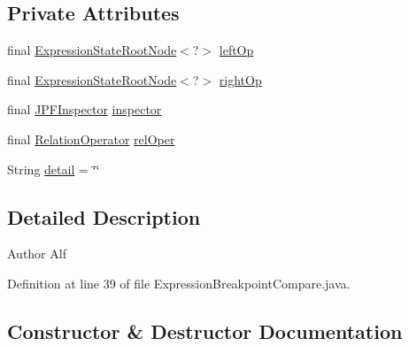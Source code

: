 \subsection*{Private Attributes}
\begin{DoxyCompactItemize}
\item 
final \hyperlink{interfacegov_1_1nasa_1_1jpf_1_1inspector_1_1server_1_1expression_1_1_expression_state_root_node}{Expression\+State\+Root\+Node}$<$?$>$ \hyperlink{classgov_1_1nasa_1_1jpf_1_1inspector_1_1server_1_1expression_1_1expressions_1_1_expression_breakpoint_compare_a49b46d9e770b81400b8ea740cfa8d0c0}{left\+Op}
\item 
final \hyperlink{interfacegov_1_1nasa_1_1jpf_1_1inspector_1_1server_1_1expression_1_1_expression_state_root_node}{Expression\+State\+Root\+Node}$<$?$>$ \hyperlink{classgov_1_1nasa_1_1jpf_1_1inspector_1_1server_1_1expression_1_1expressions_1_1_expression_breakpoint_compare_aa654f6c8084c0a74236e700b8895e9fe}{right\+Op}
\item 
final \hyperlink{classgov_1_1nasa_1_1jpf_1_1inspector_1_1server_1_1jpf_1_1_j_p_f_inspector}{J\+P\+F\+Inspector} \hyperlink{classgov_1_1nasa_1_1jpf_1_1inspector_1_1server_1_1expression_1_1expressions_1_1_expression_breakpoint_compare_a0dedb19c329e4df915322e208b3447ac}{inspector}
\item 
final \hyperlink{interfacegov_1_1nasa_1_1jpf_1_1inspector_1_1server_1_1programstate_1_1relop_1_1_relation_operator}{Relation\+Operator} \hyperlink{classgov_1_1nasa_1_1jpf_1_1inspector_1_1server_1_1expression_1_1expressions_1_1_expression_breakpoint_compare_afa03bce7e9ae427e0228b57d8076bc4b}{rel\+Oper}
\item 
String \hyperlink{classgov_1_1nasa_1_1jpf_1_1inspector_1_1server_1_1expression_1_1expressions_1_1_expression_breakpoint_compare_ac747595da4842e47498aa595c714f7ac}{detail} = \char`\"{}\char`\"{}
\end{DoxyCompactItemize}


\subsection{Detailed Description}
\begin{DoxyAuthor}{Author}
Alf 
\end{DoxyAuthor}


Definition at line 39 of file Expression\+Breakpoint\+Compare.\+java.



\subsection{Constructor \& Destructor Documentation}
